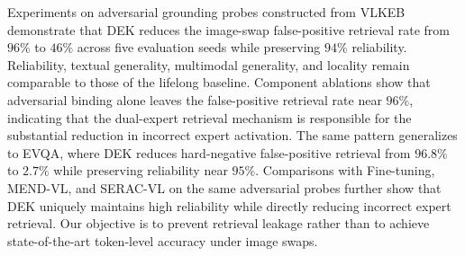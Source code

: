 \documentclass[letterpaper]{article} %
\begin{document}
Experiments on adversarial grounding probes constructed from VLKEB demonstrate that DEK reduces the image-swap false-positive retrieval rate from $96\%$ to $46\%$ across five evaluation seeds while preserving $94\%$ reliability. Reliability, textual generality, multimodal generality, and locality remain comparable to those of the lifelong baseline. Component ablations show that adversarial binding alone leaves the false-positive retrieval rate near $96\%$, indicating that the dual-expert retrieval mechanism is responsible for the substantial reduction in incorrect expert activation. 
The same pattern generalizes to EVQA, where DEK reduces hard-negative false-positive retrieval from $96.8\%$ to $2.7\%$ while preserving reliability near $95\%$. Comparisons with Fine-tuning, MEND-VL, and SERAC-VL on the same adversarial probes further show that DEK uniquely maintains high reliability while directly reducing incorrect expert retrieval. Our objective is to prevent retrieval leakage rather than to achieve state-of-the-art token-level accuracy under image swaps.



\end{document}
